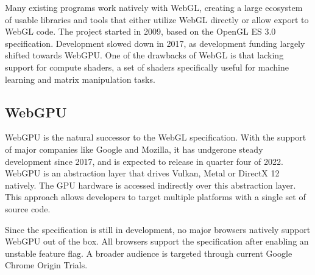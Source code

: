 Many existing programs work natively with WebGL, creating a large ecosystem of usable libraries
and tools that either utilize WebGL directly or allow export to WebGL code.
The project started in 2009, based on the OpenGL ES 3.0 specification.
Development slowed down in 2017, as development funding largely shifted towards WebGPU.
One of the drawbacks of WebGL is that lacking support for compute shaders, a set of shaders
specifically useful for machine learning and matrix manipulation tasks.

\subsection{WebGPU}
WebGPU is the natural successor to the WebGL specification.
With the support of major companies like Google and Mozilla, it has undgerone steady
development since 2017, and is expected to release in quarter four of 2022.
WebGPU is an abstraction layer that drives Vulkan, Metal or DirectX 12 natively.
The GPU hardware is accessed indirectly over this abstraction layer.
This approach allows developers to target multiple platforms with a single set of source code.

Since the specification is still in development, no major browsers natively support WebGPU
out of the box. All browsers support the specification after enabling an unstable feature flag.
A broader audience is targeted through current Google Chrome Origin Trials.

